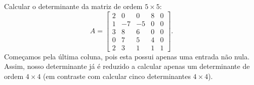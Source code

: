\begin{ex}\label{exp:det2}
Calcular o determinante da matriz de ordem $5 \times 5$:
\begin{equation}
A =
\begin{bmatrix}
2 & 0 & 0 & 8 & 0 \\
1 & -7 & -5 & 0 & 0 \\
3 & 8 & 6 & 0 & 0 \\
0 & 7 & 5 & 4 & 0 \\
2 & 3 & 1 & 1 & 1
\end{bmatrix}.
\end{equation} Começamos pela última coluna, pois esta possui apenas uma entrada não nula. Assim, nosso determinante já é reduzido a calcular apenas um determinante de ordem $4 \times 4$ (em contraste com calcular cinco determinantes $4\times 4$).


\end{ex}
